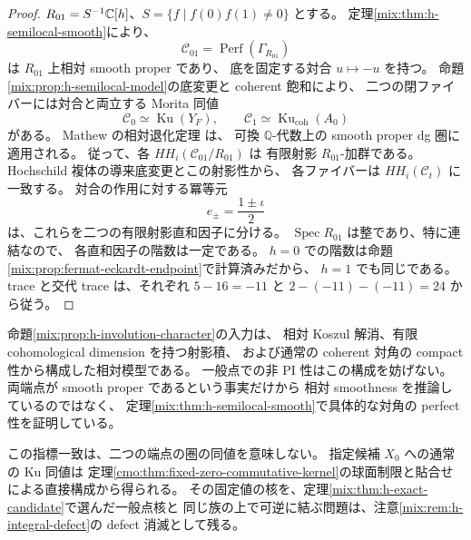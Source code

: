\begin{proof}
$R_{01}=S^{-1}\mathbb C[h]$、$S=\{f\mid f(0)f(1)\ne0\}$ とする。
定理\ref{mix:thm:h-semilocal-smooth}により、
\[
 \mathcal C_{01}=\operatorname{Perf}(\Gamma_{R_{01}})
\]
は $R_{01}$ 上相対 smooth proper であり、
底を固定する対合 $u\mapsto-u$ を持つ。
命題\ref{mix:prop:h-semilocal-model}の底変更と coherent 飽和により、
二つの閉ファイバーには対合と両立する Morita 同値
\[
 \mathcal C_0\simeq\operatorname{Ku}(Y_F),\qquad
 \mathcal C_1\simeq\operatorname{Ku}_{\mathrm{coh}}(A_0)
\]
がある。
Mathew の相対退化定理
\cite[Theorem~1.3]{CMOMathewDegeneration}は、
可換 $\mathbb Q$-代数上の smooth proper dg 圏に適用される。
従って、各 $HH_i(\mathcal C_{01}/R_{01})$ は
有限射影 $R_{01}$-加群である。
Hochschild 複体の導来底変更とこの射影性から、
各ファイバーは $HH_i(\mathcal C_t)$ に一致する。
対合の作用に対する冪等元
\[
 e_\pm=\frac{1\pm\iota}{2}
\]
は、これらを二つの有限射影直和因子に分ける。
$\operatorname{Spec}R_{01}$ は整であり、特に連結なので、
各直和因子の階数は一定である。
$h=0$ での階数は命題\ref{mix:prop:fermat-eckardt-endpoint}で計算済みだから、
$h=1$ でも同じである。
trace と交代 trace は、それぞれ $5-16=-11$ と
$2-(-11)-(-11)=24$ から従う。
\end{proof}

\begin{remark}[指標比較と核の構成の役割]
\label{mix:rem:h-relative-gap}
命題\ref{mix:prop:h-involution-character}の入力は、
相対 Koszul 解消、有限 cohomological dimension を持つ射影積、
および通常の coherent 対角の compact 性から構成した相対模型である。
一般点での非 PI 性はこの構成を妨げない。
両端点が smooth proper であるという事実だけから
相対 smoothness を推論しているのではなく、
定理\ref{mix:thm:h-semilocal-smooth}で具体的な対角の perfect 性を証明している。

この指標一致は、二つの端点の圏の同値を意味しない。
指定候補 $X_0$ への通常の Ku 同値は
定理\ref{cmo:thm:fixed-zero-commutative-kernel}の球面制限と貼合せによる直接構成から得られる。
その固定値の核を、定理\ref{mix:thm:h-exact-candidate}で選んだ一般点核と
同じ族の上で可逆に結ぶ問題は、注意\ref{mix:rem:h-integral-defect}の defect 消滅として残る。
\end{remark}
